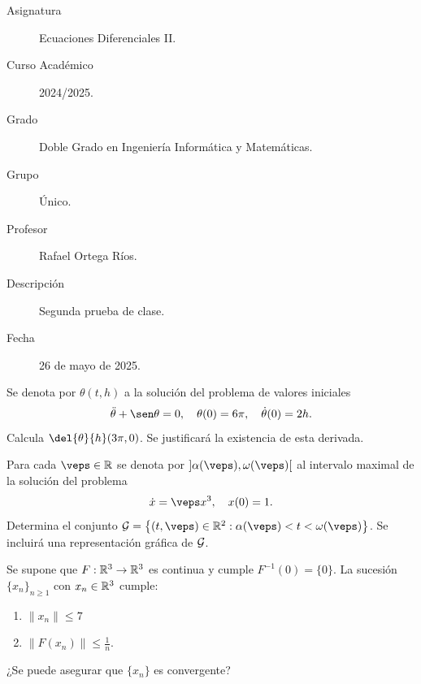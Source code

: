 \documentclass[12pt]{article}
\begin{document}

    
    

    \begin{description}
        \item[Asignatura] Ecuaciones Diferenciales II.
        \item[Curso Académico] 2024/2025.
        \item[Grado] Doble Grado en Ingeniería Informática y Matemáticas.
        \item[Grupo] Único.
        \item[Profesor] Rafael Ortega Ríos.
        \item[Descripción] Segunda prueba de clase.
        \item[Fecha] 26 de mayo de 2025.
    \end{description}
    \newpage


    
    \begin{ejercicio}
        Se denota por $\theta(t, h)$ a la solución del problema de valores iniciales
        \[
        \ddot{\theta} + \sen \theta = 0, \quad \theta(0) = 6\pi, \quad \dot{\theta}(0) = 2h.
        \]
        Calcula $\del{\theta}{h}(3\pi, 0)$. Se justificará la existencia de esta derivada.
    \end{ejercicio}

    \begin{ejercicio}
        Para cada $\veps \in \bb{R}$ se denota por $\left]\alpha(\veps), \omega(\veps)\right[$ al intervalo maximal de la solución del problema
        \[
        \dot{x} = \veps x^3, \quad x(0) = 1.
        \]
        Determina el conjunto $\cc{G} = \left\{(t, \veps) \in \bb{R}^2 : \alpha(\veps) < t < \omega(\veps)\right\}$. Se incluirá una representación gráfica de $\mathcal{G}$.
    \end{ejercicio}

    \begin{ejercicio}
        Se supone que $F : \mathbb{R}^3 \to \mathbb{R}^3$ es continua y cumple $F^{-1}(0) = \{0\}$. La sucesión $\{x_n\}_{n \geq 1}$ con $x_n \in \mathbb{R}^3$ cumple:
        \begin{enumerate}[label=\roman*)]
            \item $\|x_n\| \leq 7$
            \item $\|F(x_n)\| \leq \frac{1}{n}$.
        \end{enumerate}
        ¿Se puede asegurar que $\{x_n\}$ es convergente?
    \end{ejercicio}
\end{document}
